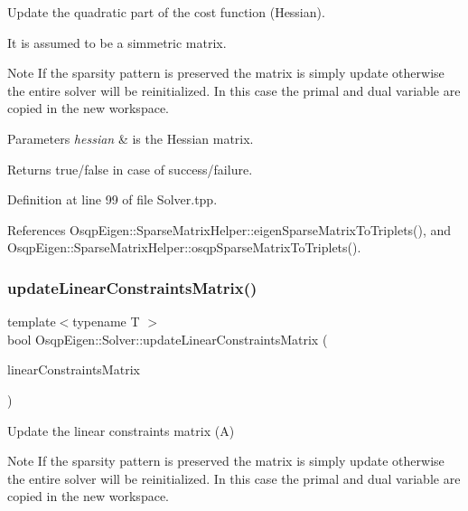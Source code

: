Update the quadratic part of the cost function (Hessian). 

It is assumed to be a simmetric matrix. \begin{DoxyNote}{Note}
If the sparsity pattern is preserved the matrix is simply update otherwise the entire solver will be reinitialized. In this case the primal and dual variable are copied in the new workspace.
\end{DoxyNote}

\begin{DoxyParams}{Parameters}
{\em hessian} & is the Hessian matrix. \\
\hline
\end{DoxyParams}
\begin{DoxyReturn}{Returns}
true/false in case of success/failure. 
\end{DoxyReturn}


Definition at line 99 of file Solver.\+tpp.



References Osqp\+Eigen\+::\+Sparse\+Matrix\+Helper\+::eigen\+Sparse\+Matrix\+To\+Triplets(), and Osqp\+Eigen\+::\+Sparse\+Matrix\+Helper\+::osqp\+Sparse\+Matrix\+To\+Triplets().

\mbox{\label{classOsqpEigen_1_1Solver_a4eb3a0b2bec16b00dfc8334d4ff9ab8d}} 
\subsubsection{\texorpdfstring{update\+Linear\+Constraints\+Matrix()}{updateLinearConstraintsMatrix()}}
{\footnotesize\ttfamily template$<$typename T $>$ \\
bool Osqp\+Eigen\+::\+Solver\+::update\+Linear\+Constraints\+Matrix (\begin{DoxyParamCaption}\item[{const Eigen\+::\+Sparse\+Matrix$<$ T $>$ \&}]{linear\+Constraints\+Matrix }\end{DoxyParamCaption})}



Update the linear constraints matrix (A) 

\begin{DoxyNote}{Note}
If the sparsity pattern is preserved the matrix is simply update otherwise the entire solver will be reinitialized. In this case the primal and dual variable are copied in the new workspace.
\end{DoxyNote}

